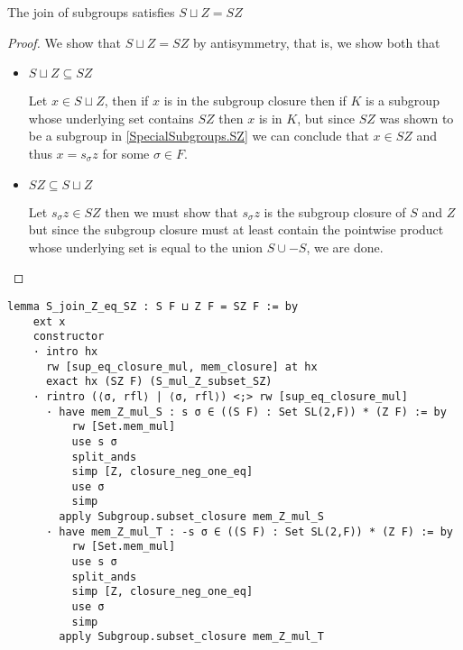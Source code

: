 \begin{lemma}
    \label{SpecialSubgroups.S_join_Z_eq_SZ}
    \leanok
    The join of subgroups satisfies $S \sqcup Z = SZ$
\end{lemma}
\begin{proof}
\leanok
We show that $S \sqcup Z = SZ$ by antisymmetry, that is, we show both that
\begin{itemize}
    
    \item $S \sqcup Z \subseteq SZ$
    
    Let $x \in S \sqcup Z$, then if $x$ is in the subgroup closure then if $K$ is a subgroup whose underlying set contains $SZ$ then $x$ is in $K$,
    but since $SZ$ was shown to be a subgroup in \ref{SpecialSubgroups.SZ} we can conclude that $x \in SZ$ and thus $x = s_\sigma z$ for some $\sigma \in F$.
    
    \item $SZ \subseteq S \sqcup Z$
    
    Let $s_\sigma z \in SZ$ then we must show that $s_\sigma z$ is the subgroup closure of $S$ and $Z$ but since the subgroup closure 
    must at least contain the pointwise product whose underlying set is equal to the union $S \cup -S$, we are done.
\end{itemize}
\end{proof}
\begin{footnotesize}
\begin{verbatim}
lemma S_join_Z_eq_SZ : S F ⊔ Z F = SZ F := by
    ext x
    constructor
    · intro hx
      rw [sup_eq_closure_mul, mem_closure] at hx
      exact hx (SZ F) (S_mul_Z_subset_SZ)
    · rintro (⟨σ, rfl⟩ | ⟨σ, rfl⟩) <;> rw [sup_eq_closure_mul]
      · have mem_Z_mul_S : s σ ∈ ((S F) : Set SL(2,F)) * (Z F) := by
          rw [Set.mem_mul]
          use s σ
          split_ands
          simp [Z, closure_neg_one_eq]
          use σ
          simp
        apply Subgroup.subset_closure mem_Z_mul_S
      · have mem_Z_mul_T : -s σ ∈ ((S F) : Set SL(2,F)) * (Z F) := by
          rw [Set.mem_mul]
          use s σ
          split_ands
          simp [Z, closure_neg_one_eq]
          use σ
          simp
        apply Subgroup.subset_closure mem_Z_mul_T
\end{verbatim}
\end{footnotesize}

